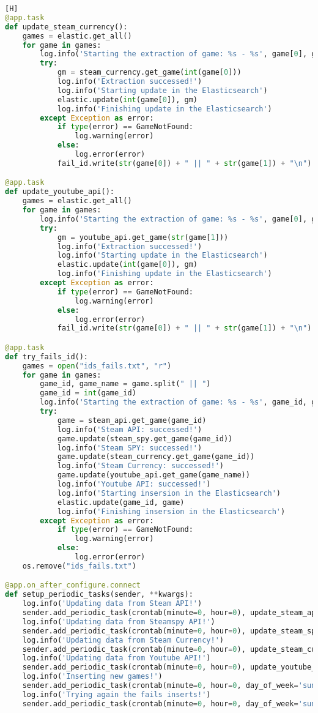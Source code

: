 \begin{lstlisting}[language={Python}, caption = {Código do \textit{\textbf{Schedule}}}, label = {code:schedule}] [H]
@app.task
def update_steam_currency():
	games = elastic.get_all()
	for game in games:
		log.info('Starting the extraction of game: %s - %s', game[0], game[1])
		try:
			gm = steam_currency.get_game(int(game[0]))
			log.info('Extraction successed!')
			log.info('Starting update in the Elasticsearch')
			elastic.update(int(game[0]), gm)
			log.info('Finishing update in the Elasticsearch')
		except Exception as error:
			if type(error) == GameNotFound:
				log.warning(error)
			else:
				log.error(error)
			fail_id.write(str(game[0]) + " || " + str(game[1]) + "\n")

@app.task
def update_youtube_api():
	games = elastic.get_all()
	for game in games:
		log.info('Starting the extraction of game: %s - %s', game[0], game[1])
		try:
			gm = youtube_api.get_game(str(game[1]))
			log.info('Extraction successed!')
			log.info('Starting update in the Elasticsearch')
			elastic.update(int(game[0]), gm)
			log.info('Finishing update in the Elasticsearch')
		except Exception as error:
			if type(error) == GameNotFound:
				log.warning(error)
			else:
				log.error(error)
			fail_id.write(str(game[0]) + " || " + str(game[1]) + "\n")

@app.task
def try_fails_id():
	games = open("ids_fails.txt", "r")
	for game in games:
		game_id, game_name = game.split(" || ")
		game_id = int(game_id)
		log.info('Starting the extraction of game: %s - %s', game_id, game_name)
		try:
			game = steam_api.get_game(game_id)
			log.info('Steam API: successed!')
			game.update(steam_spy.get_game(game_id))
			log.info('Steam SPY: successed!')
			game.update(steam_currency.get_game(game_id))
			log.info('Steam Currency: successed!')
			game.update(youtube_api.get_game(game_name))
			log.info('Youtube API: successed!')
			log.info('Starting insersion in the Elasticsearch')
			elastic.update(game_id, game)
			log.info('Finishing insersion in the Elasticsearch')
		except Exception as error:
			if type(error) == GameNotFound:
				log.warning(error)
			else:
				log.error(error)
	os.remove("ids_fails.txt")

@app.on_after_configure.connect
def setup_periodic_tasks(sender, **kwargs):
	log.info('Updating data from Steam API!')
	sender.add_periodic_task(crontab(minute=0, hour=0), update_steam_api())
	log.info('Updating data from Steamspy API!')
	sender.add_periodic_task(crontab(minute=0, hour=0), update_steam_spy())
	log.info('Updating data from Steam Currency!')
	sender.add_periodic_task(crontab(minute=0, hour=0), update_steam_currency())
	log.info('Updating data from Youtube API!')
	sender.add_periodic_task(crontab(minute=0, hour=0), update_youtube_api())
	log.info('Inserting new games!')
	sender.add_periodic_task(crontab(minute=0, hour=0, day_of_week='sunday'), insert_new_games())
	log.info('Trying again the fails inserts!')
	sender.add_periodic_task(crontab(minute=0, hour=0, day_of_week='sunday'), try_fails_id())
\end{lstlisting}

